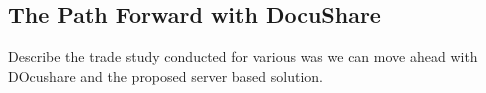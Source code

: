 \subsection{The Path Forward with DocuShare}

Describe the trade study conducted for various was we can move ahead with DOcushare and the proposed server based solution.